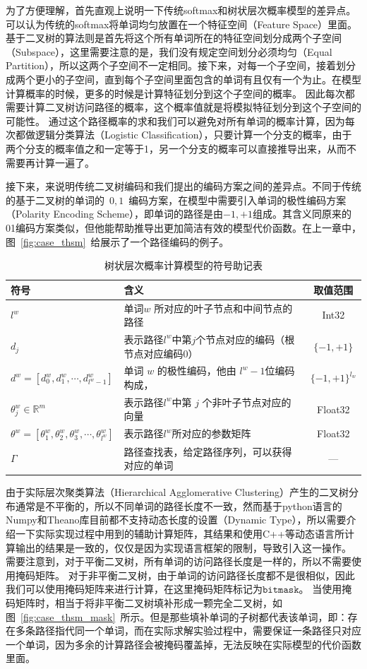 为了方便理解，首先直观上说明一下传统softmax和树状层次概率模型的差异点。可以认为传统的softmax将单词均匀放置在一个特征空间（Feature Space）里面。基于二叉树的算法则是首先将这个所有单词所在的特征空间划分成两个子空间（Subspace），这里需要注意的是，我们没有规定空间划分必须均匀（Equal Partition），所以这两个子空间不一定相同。接下来，对每一个子空间，接着划分成两个更小的子空间，直到每个子空间里面包含的单词有且仅有一个为止。在模型计算概率的时候，更多的时候是计算特征划分到这个子空间的概率。
因此每次都需要计算二叉树访问路径的概率，这个概率值就是将模拟特征划分到这个子空间的可能性。
通过这个路径概率的求和我们可以避免对所有单词的概率计算，因为每次都做逻辑分类算法（Logistic Classification），只要计算一个分支的概率，由于两个分支的概率值之和一定等于1，另一个分支的概率可以直接推导出来，从而不需要再计算一遍了。


接下来，来说明传统二叉树编码和我们提出的编码方案之间的差异点。不同于传统的基于二叉树的单词的~$0,1$~编码方案，在模型中需要引入单词的极性编码方案（Polarity Encoding Scheme），即单词的路径是由$-1,+1$组成。其含义同原来的01编码方案类似，但他能帮助推导出更加简洁有效的模型代价函数。在上一章中，图~\ref{fig:case_thsm}~给展示了一个路径编码的例子。

\begin{table}[!t]
  \centering
  \caption{树状层次概率计算模型的符号助记表\label{tab:note}}
\begin{tabular}{llc}
  \toprule
   符号&含义&取值范围\\ \midrule
$l^w$ &单词$w$ 所对应的叶子节点和中间节点的路径&Int32 \\
$d_j$&表示路径$l^w$中第$j$个节点对应的编码（根节点对应编码$0$）&$ \{-1,+1\}$\\
$ d^w=[d_0^w,d_1^w,\cdots,d_{l^w-1}^w] $& 单词 $w$ 的极性编码，他由 $l^w-1$位编码构成，&$\{-1,+1\}^{l_w}$\\
$\theta_{j}^w\in\mathbb{R}^m$ &表示路径$l^w$中第 $j$ 个非叶子节点对应的向量& Float32\\
$ \theta^w=[\theta_1^w,\theta_2^w,\theta_3^w, \cdots,\theta_{l^w}^w]$&表示路径$l^w$所对应的参数矩阵&Float32 \\
$\Gamma$ &路径查找表，给定路径序列，可以获得对应的单词& ---\\
  \bottomrule
\end{tabular}
\end{table}

由于实际层次聚类算法（Hierarchical Agglomerative Clustering）产生的二叉树分布通常是不平衡的，所以不同单词的路径长度不一致，然而基于python语言的Numpy和Theano库目前都不支持动态长度的设置（Dynamic Type），所以需要介绍一下实际实现过程中用到的辅助计算矩阵，其结果和使用C++等动态语言所计算输出的结果是一致的，仅仅是因为实现语言框架的限制，导致引入这一操作。
需要注意到，对于平衡二叉树，所有单词的访问路径长度是一样的，所以不需要使用掩码矩阵。
对于非平衡二叉树，由于单词的访问路径长度都不是很相似，因此我们可以使用掩码矩阵来进行计算，在这里掩码矩阵标记为$\mathtt{bitmask}$。
当使用掩码矩阵时，相当于将非平衡二叉树填补形成一颗完全二叉树，如图~\ref{fig:case_thsm_mask}~所示。但是那些填补单词的子树都代表该单词，即：存在多条路径指代同一个单词，而在实际求解实验过程中，需要保证一条路径只对应一个单词，因为多余的计算路径会被掩码覆盖掉，无法反映在实际模型的代价函数里面。



